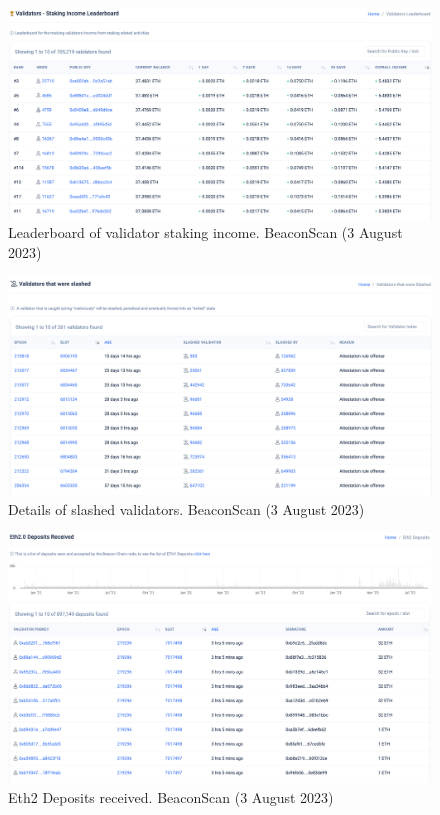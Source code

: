 \documentclass[UTF8]{article}
\begin{document}
{\begin{figure}[htbp]
\begin{center}
\includegraphics[width=\linewidth]{images/beaconscan5}
\caption{Leaderboard of validator staking income. BeaconScan (3 August 2023)}
\label{fig:beaconscan5}
\end{center}
\end{figure}

\begin{figure}[htbp]
\begin{center}
\includegraphics[width=\linewidth]{images/beaconscan6}
\caption{Details of slashed validators. BeaconScan (3 August 2023)}
\label{fig:beaconscan6}
\end{center}
\end{figure}

\begin{figure}[htbp]
\begin{center}
\includegraphics[width=\linewidth]{images/beaconscan7}
\caption{Eth2 Deposits received. BeaconScan (3 August 2023)}
\label{fig:beaconscan7}
\end{center}
\end{figure}

}
\end{document}
